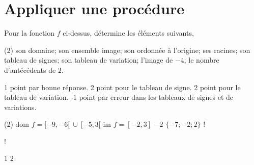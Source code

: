 \documentclass[a4paper, 12pt, parskip=half-]{scrartcl}
\begin{document}
\section*{ Appliquer une procédure}
\begin{exercise}[points=10]
    \begin{center}
        
    \end{center}
    Pour la fonction $f$ ci-dessus, détermine les éléments suivants,
    \begin{tasks}[after-item-skip=1em](2)
        \task son domaine;
        \task son ensemble image;
        \task son ordonnée à l'origine;
        \task ses racines;
        \task son tableau de signes;
        \task son tableau de variation;
        \task l'image de $-4$;
        \task le nombre d'antécédents de $2$.
    \end{tasks}
\end{exercise}
\begin{solution}
    1 point par bonne réponse.
    2 point pour le tableau de signe.
    2 point pour le tableau de variation.
    -1 point par erreur dans les tableaux de signes et de variations.
    \begin{tasks}(2)
        \task $\textrm{dom }f=[-9,-6[~\cup~[-5,3[$
        \task $\textrm{im }f=[-2,3]$
        \task $-2$
        \task $\lbrace -7;-2;2 \rbrace$
        \task!
        \task!
        \task $1$
        \task $2$
    \end{tasks}
\end{solution}
\end{document}
